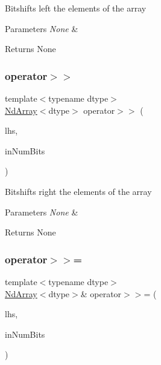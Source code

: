 Bitshifts left the elements of the array


\begin{DoxyParams}{Parameters}
{\em None} & \\
\hline
\end{DoxyParams}
\begin{DoxyReturn}{Returns}
None 
\end{DoxyReturn}
\mbox{\label{class_num_cpp_1_1_nd_array_ab15a0eab1b334b204ab5dd780c35435a}} 
\subsubsection{\texorpdfstring{operator$>$$>$}{operator>>}}
{\footnotesize\ttfamily template$<$typename dtype$>$ \\
\mbox{\hyperlink{class_num_cpp_1_1_nd_array}{Nd\+Array}}$<$dtype$>$ operator$>$$>$ (\begin{DoxyParamCaption}\item[{const \mbox{\hyperlink{class_num_cpp_1_1_nd_array}{Nd\+Array}}$<$ dtype $>$ \&}]{lhs,  }\item[{\mbox{\hyperlink{namespace_num_cpp_aee396d0469d6031cd18118c0a45bcdda}{uint8}}}]{in\+Num\+Bits }\end{DoxyParamCaption})\hspace{0.3cm}{\ttfamily [friend]}}

Bitshifts right the elements of the array


\begin{DoxyParams}{Parameters}
{\em None} & \\
\hline
\end{DoxyParams}
\begin{DoxyReturn}{Returns}
None 
\end{DoxyReturn}
\mbox{\label{class_num_cpp_1_1_nd_array_a176583bd05fbbbf2f7ef9984cac49f76}} 
\subsubsection{\texorpdfstring{operator$>$$>$=}{operator>>=}}
{\footnotesize\ttfamily template$<$typename dtype$>$ \\
\mbox{\hyperlink{class_num_cpp_1_1_nd_array}{Nd\+Array}}$<$dtype$>$\& operator$>$$>$= (\begin{DoxyParamCaption}\item[{\mbox{\hyperlink{class_num_cpp_1_1_nd_array}{Nd\+Array}}$<$ dtype $>$ \&}]{lhs,  }\item[{\mbox{\hyperlink{namespace_num_cpp_aee396d0469d6031cd18118c0a45bcdda}{uint8}}}]{in\+Num\+Bits }\end{DoxyParamCaption})\hspace{0.3cm}{\ttfamily [friend]}}

